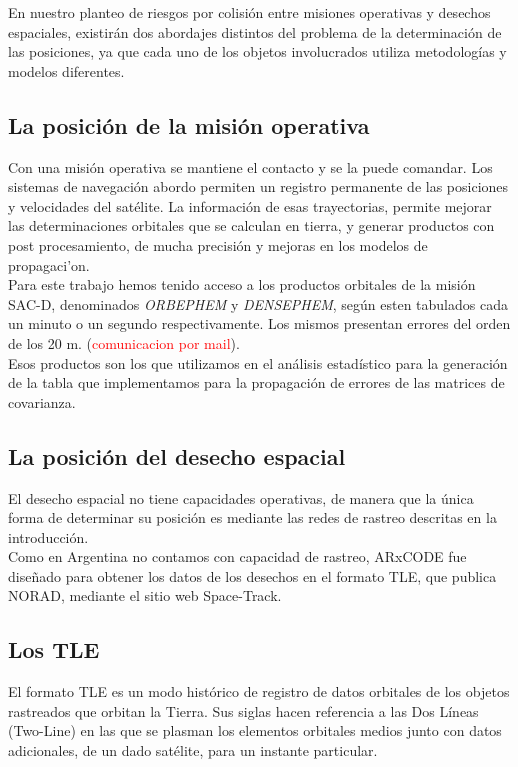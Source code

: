 En nuestro planteo de riesgos por colisi\'on entre misiones operativas y desechos espaciales, existir\'an dos abordajes distintos del problema de la determinaci\'on de las posiciones, ya que cada uno de los objetos involucrados utiliza metodolog\'ias y modelos diferentes.

\subsection*{La posici\'on de la misi\'on operativa}
Con una misi\'on operativa se mantiene el contacto y se la puede comandar. Los sistemas de navegaci\'on abordo permiten un registro permanente de las posiciones y velocidades del sat\'elite. La informaci\'on de esas trayectorias, permite mejorar las determinaciones orbitales que se calculan en tierra, y generar productos con post procesamiento, de mucha precisi\'on y mejoras en los modelos de propagaci'on.\\
Para este trabajo hemos tenido acceso a los productos orbitales de la misi\'on SAC-D, denominados {\it{ORBEPHEM}}  y {\it{DENSEPHEM}}, seg\'un esten tabulados cada un minuto o un segundo respectivamente. Los mismos presentan errores del orden de los 20 m. (\textcolor{red}{comunicacion por mail}).\\
Esos productos son los que utilizamos en el an\'alisis estad\'istico para la generaci\'on de la tabla que implementamos para la propagaci\'on de errores de las matrices de covarianza.\\

\subsection*{La posici\'on del desecho espacial}
El desecho espacial no tiene capacidades operativas, de manera que la \'unica forma de determinar su posici\'on es mediante las redes de rastreo descritas en la introducci\'on.\\
Como en Argentina no contamos con capacidad de rastreo, ARxCODE fue dise\~nado para obtener los datos de los desechos en el formato TLE, que publica NORAD, mediante el sitio web Space-Track.\\


\subsection*{Los TLE}{\label{subsec:tleformat}}

El formato TLE es un modo histórico de registro de datos orbitales de los objetos rastreados que orbitan la Tierra. Sus siglas  hacen referencia a las Dos Líneas (Two-Line) en las que se plasman los elementos orbitales medios junto con datos adicionales, de un dado satélite, para un instante particular.

